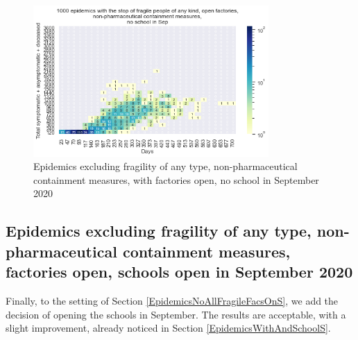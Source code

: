 \documentclass[11pt]{article}
\begin{document}
\begin{figure}[H]
\begin{center}
\includegraphics[width=0.8\textwidth]{HM30_readRunResults1k_with_NoAllFrag_openFacs_at20_plusHMlog.png}
\caption{Epidemics excluding fragility of any type, non-pharmaceutical containment measures, with factories open, no school in September 2020}
\label{EpidemicsNoAllFragileFacsOnHM}
\end{center}
\end{figure}




\subsection{Epidemics excluding fragility of any type, non-pharmaceutical containment measures, factories open, schools open in September 2020}
\label{EpidemicsNoAllFragileFacsOnSchOnS}

Finally, to the setting of Section \ref{EpidemicsNoAllFragileFacsOnS}, we add the decision of opening the schools in September. The results are acceptable, with a slight improvement, already noticed in Section \ref{EpidemicsWithAndSchoolS}.
\end{document}
